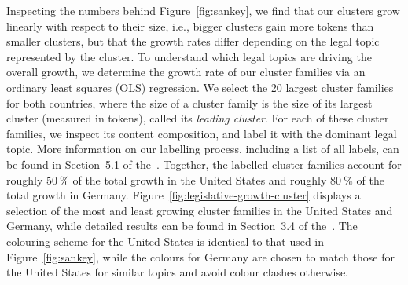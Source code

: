Inspecting the numbers behind Figure~\ref{fig:sankey}, 
we find that our clusters grow linearly with respect to their size, 
i.e., bigger clusters gain more tokens than smaller clusters, 
but that the growth rates differ depending on the legal topic represented by the cluster. 
To understand which legal topics are driving the overall growth, 
we determine the growth rate of our cluster families via an ordinary least squares (OLS) regression.
We select the 20 largest cluster families for both countries,
where the size of a cluster family is the size of its largest cluster (measured in tokens), called its \emph{leading cluster}.
For each of these cluster families, we inspect its content composition, 
and label it with the dominant legal topic.
More information on our labelling process, including a list of all labels, can be found in Section~5.1 of the~\suppi.
Together, the labelled cluster families account for roughly $50~\%$ of the total growth in the United States and roughly $80~\%$ of the total growth in Germany.
Figure~\ref{fig:legislative-growth-cluster} displays a selection of the most and least growing cluster families in the United States and Germany,
while detailed results can be found in Section~3.4 of the~\suppi. 
The colouring scheme for the United States is identical to that used in Figure~\ref{fig:sankey}, 
while the colours for Germany are chosen to match those for the United States for similar topics and avoid colour clashes otherwise.

